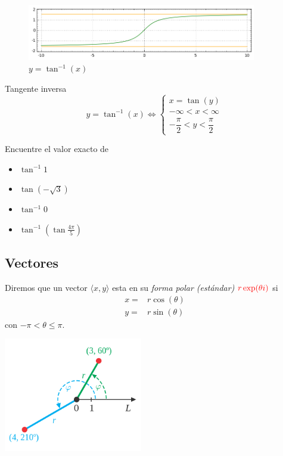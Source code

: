 {}
	\begin{figure}[h]
		\centering
		\includegraphics[width=10cm,keepaspectratio=true]{./trig/arctan.png}
		\caption{$y=\tan^{-1}(x)$}
		\label{fig:arctan}
	\end{figure}

{Tangente inversa}
	$$y=\tan^{-1}(x)\iff
	\begin{cases}
		x=\tan(y)\\
		-\infty < x < \infty \\
		-\dfrac{\pi}{2} < y < \dfrac{\pi}{2}
	\end{cases}
	$$


{}
	\begin{problema}
		Encuentre el valor exacto de
		\begin{itemize}
			\item $\tan^{-1} 1$ 
			\item $\tan(-\sqrt{3})$ 
			\item $\tan^{-1}0$ 
			\item $\tan^{-1}\left( \tan\frac{4\pi}{5} \right)$
		\end{itemize}
		
	\end{problema}


\subsection{Vectores}
{}
	Diremos que un vector $\langle x,y \rangle$ esta en su \emph{forma polar (estándar)} ${\color{red}r\exp(\theta i)}$ si 
	\begin{align*}
		x =& r\cos(\theta)\\
		y =& r\sin(\theta)
	\end{align*} con $-\pi < \theta \leq \pi$.

{}
	\begin{center}
		\includegraphics[height=5cm,keepaspectratio=true]{./trig/Examples_of_Polar_Coordinates.png}
	\end{center}
	

